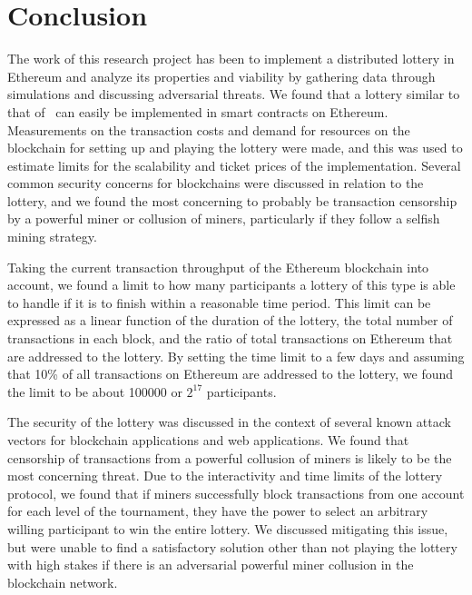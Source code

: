 \chapter{Conclusion}
\label{chap:conclusion}


The work of this research project has been to implement a distributed lottery in Ethereum and analyze its properties and viability by gathering data through simulations and discussing adversarial threats. We found that a lottery similar to that of~\cite{miller_zero-collateral_2017} can easily be implemented in smart contracts on Ethereum. Measurements on the transaction costs and demand for resources on the blockchain for setting up and playing the lottery were made, and this was used to estimate limits for the scalability and ticket prices of the implementation. Several common security concerns for blockchains were discussed in relation to the lottery, and we found the most concerning to probably be transaction censorship by a powerful miner or collusion of miners, particularly if they follow a selfish mining strategy.

Taking the current transaction throughput of the Ethereum blockchain into account, we found a limit to how many participants a lottery of this type is able to handle if it is to finish within a reasonable time period. This limit can be expressed as a linear function of the duration of the lottery, the total number of transactions in each block, and the ratio of total transactions on Ethereum that are addressed to the lottery. By setting the time limit to a few days and assuming that 10\% of all transactions on Ethereum are addressed to the lottery, we found the limit to be about 100000 or $2^{17}$ participants.

The security of the lottery was discussed in the context of several known attack vectors for blockchain applications and web applications. We found that censorship of transactions from a powerful collusion of miners is likely to be the most concerning threat. Due to the interactivity and time limits of the lottery protocol, we found that if miners successfully block transactions from one account for each level of the tournament, they have the power to select an arbitrary willing participant to win the entire lottery.
We discussed mitigating this issue, but were unable to find a satisfactory solution other than not playing the lottery with high stakes if there is an adversarial powerful miner collusion in the blockchain network. 

